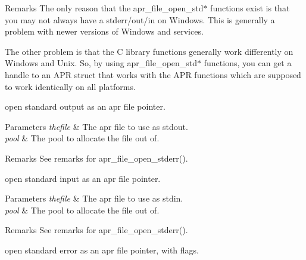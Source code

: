 \begin{DoxyRemark}{Remarks}
The only reason that the apr\+\_\+file\+\_\+open\+\_\+std$\ast$ functions exist is that you may not always have a stderr/out/in on Windows. This is generally a problem with newer versions of Windows and services.

The other problem is that the C library functions generally work differently on Windows and Unix. So, by using apr\+\_\+file\+\_\+open\+\_\+std$\ast$ functions, you can get a handle to an A\+PR struct that works with the A\+PR functions which are supposed to work identically on all platforms.
\end{DoxyRemark}
open standard output as an apr file pointer. 
\begin{DoxyParams}{Parameters}
{\em thefile} & The apr file to use as stdout. \\
\hline
{\em pool} & The pool to allocate the file out of.\\
\hline
\end{DoxyParams}
\begin{DoxyRemark}{Remarks}
See remarks for apr\+\_\+file\+\_\+open\+\_\+stderr().
\end{DoxyRemark}
open standard input as an apr file pointer. 
\begin{DoxyParams}{Parameters}
{\em thefile} & The apr file to use as stdin. \\
\hline
{\em pool} & The pool to allocate the file out of.\\
\hline
\end{DoxyParams}
\begin{DoxyRemark}{Remarks}
See remarks for apr\+\_\+file\+\_\+open\+\_\+stderr().
\end{DoxyRemark}
open standard error as an apr file pointer, with flags. 
